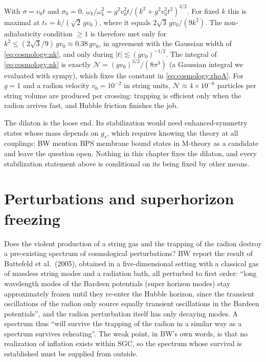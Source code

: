 \begin{example}\label{ex:cosmology:modes}
With $\sigma=v_0t$ and $\sigma_0=0$, $\dot\omega_k/\omega_k^2=g^2v_0^2t/(k^2+g^2v_0^2t^2)^{3/2}$.
For fixed $k$ this is maximal at $t_*=k/(\sqrt2\,gv_0)$, where it equals
$2\sqrt3\,gv_0/(9k^2)$. The non-adiabaticity condition $\ge1$ is therefore met only for
$k^2\le(2\sqrt3/9)\,gv_0\approx0.38\,gv_0$, in agreement with the Gaussian width of
\eqref{eq:cosmology:nk}, and only during $|t|\lesssim(gv_0)^{-1/2}$. The integral of
\eqref{eq:cosmology:nk} is exactly $\mathcal N=(gv_0)^{3/2}/(8\pi^3)$ (a Gaussian integral we
evaluated with sympy), which fixes the constant in \eqref{eq:cosmology:rhoA}. For $g=1$ and a
radion velocity $v_0=10^{-2}$ in string units, $\mathcal N\approx4\times10^{-6}$ particles per
string volume are produced per crossing: trapping is efficient only when the radion arrives
fast, and Hubble friction finishes the job.
\end{example}

The dilaton is the loose end. Its stabilization would need enhanced-symmetry states whose
mass depends on $g_s$, which requires knowing the theory at all couplings; BW mention BPS
membrane bound states in M-theory as a candidate and leave the question open.
 Nothing in this chapter fixes the dilaton, and every
stabilization statement above is conditional on its being fixed by other means.

\section{Perturbations and superhorizon freezing}\label{sec:cosmology:perturbations}

Does the violent production of a string gas and the trapping of the radion destroy a
pre-existing spectrum of cosmological perturbations? BW report the result of Battefeld et
al.\ (2005), obtained in a five-dimensional setting with a classical gas of massless string
modes and a radiation bath, all perturbed to first order: ``long wavelength modes of the
Bardeen potentials (super horizon modes) stay approximately frozen until they re-enter the
Hubble horizon, since the transient oscillations of the radion only source equally
transient oscillations in the Bardeen potentials'', and the radion perturbation itself has
only decaying modes. A spectrum thus ``will survive the trapping of the radion in a similar
way as a spectrum survives reheating''.  The weak point, in
BW's own words, is that no realization of inflation exists within SGC, so the spectrum
whose survival is established must be supplied from outside. 

